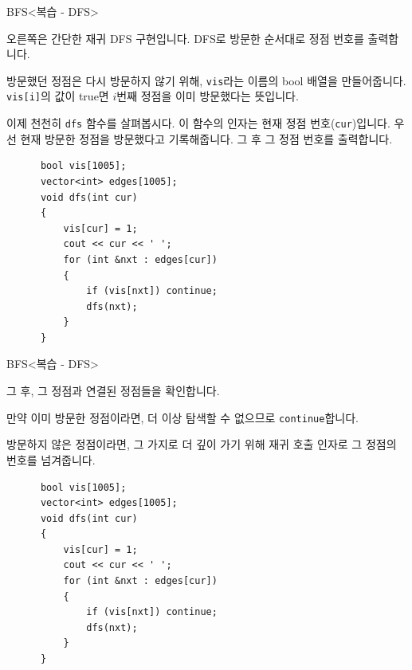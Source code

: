 \begin{frame}[fragile]{BFS}{<복습 - DFS>}
  \begin{twocol}
    오른쪽은 간단한 재귀 DFS 구현입니다. DFS로 방문한 순서대로 정점 번호를 출력합니다.
    \par\vspace{2mm}
    방문했던 정점은 다시 방문하지 않기 위해, \texttt{vis}라는 이름의 bool 배열을
    만들어줍니다. \texttt{vis[i]}의 값이 true면 $i$번째 정점을 이미 방문했다는 뜻입니다.
    \par\vspace{2mm}
    이제 천천히 \texttt{dfs} 함수를 살펴봅시다. 이 함수의 인자는 현재 정점 번호(\texttt{cur})입니다.
    우선 현재 방문한 정점을 방문했다고 기록해줍니다. 그 후 그 정점 번호를 출력합니다.
  \colsplit
    \begin{verbatim}
      bool vis[1005];
      vector<int> edges[1005];
      void dfs(int cur)
      {
          vis[cur] = 1;
          cout << cur << ' ';
          for (int &nxt : edges[cur])
          {
              if (vis[nxt]) continue;
              dfs(nxt);
          }
      }
    \end{verbatim}
  \end{twocol}
\end{frame}

\begin{frame}[fragile]{BFS}{<복습 - DFS>}
  \begin{twocol}
    \vspace{6mm}
    그 후, 그 정점과 연결된 정점들을 확인합니다.\par\vspace{2mm}
    만약 이미 방문한 정점이라면, 더 이상 탐색할 수 없으므로 \texttt{continue}합니다.\par\vspace{2mm}
    방문하지 않은 정점이라면, 그 가지로 더 깊이 가기 위해 재귀 호출 인자로 그 정점의
    번호를 넘겨줍니다.
  \colsplit
    \begin{verbatim}
      bool vis[1005];
      vector<int> edges[1005];
      void dfs(int cur)
      {
          vis[cur] = 1;
          cout << cur << ' ';
          for (int &nxt : edges[cur])
          {
              if (vis[nxt]) continue;
              dfs(nxt);
          }
      }
    \end{verbatim}
  \end{twocol}
\end{frame}



